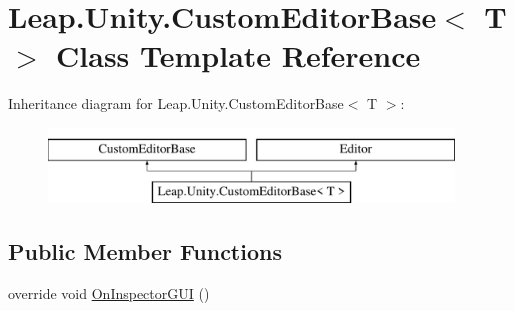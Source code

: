 \hypertarget{class_leap_1_1_unity_1_1_custom_editor_base}{}\section{Leap.\+Unity.\+Custom\+Editor\+Base$<$ T $>$ Class Template Reference}
\label{class_leap_1_1_unity_1_1_custom_editor_base}
Inheritance diagram for Leap.\+Unity.\+Custom\+Editor\+Base$<$ T $>$\+:\begin{figure}[H]
\begin{center}
\leavevmode
\includegraphics[height=2.000000cm]{class_leap_1_1_unity_1_1_custom_editor_base}
\end{center}
\end{figure}
\subsection*{Public Member Functions}
\begin{DoxyCompactItemize}
\item 
override void \mbox{\hyperlink{class_leap_1_1_unity_1_1_custom_editor_base_aede403b8b7e1c92cda1f1ad843c804cb}{On\+Inspector\+G\+UI}} ()
\end{DoxyCompactItemize}
